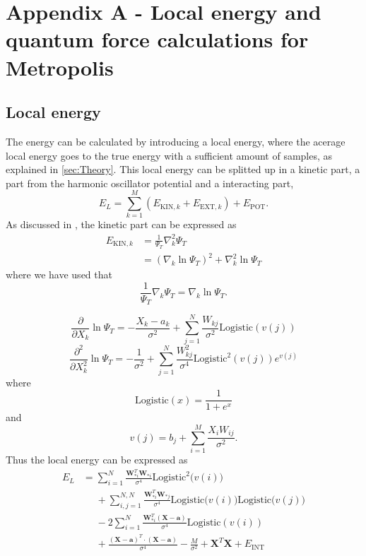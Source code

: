 \documentclass[norsk,a4paper,12pt]{article}
\begin{document}
\section{Appendix A - Local energy and quantum force calculations for Metropolis} \label{sec:appendix_A}

\subsection{Local energy}

The energy can be calculated by introducing a local energy, where the acerage local energy goes to the true energy with a sufficient amount of samples, as explained in \ref{sec:Theory}. This local energy can be splitted up in a kinetic part, a part from the harmonic oscillator potential and a interacting part,
\begin{equation}
E_L=\sum_{k=1}^{M}(E_{\text{KIN},k} + E_{\text{EXT},k})+E_{\text{POT}}.
\end{equation}
As discussed in \cite{Nordhagen}, the kinetic part can be expressed as
\begin{align}
E_{\text{KIN},k}&=\frac{1}{\Psi_T}\nabla_k^2\Psi_T\\
&=(\nabla_k\ln\Psi_T)^2+\nabla_k^2\ln\Psi_T
\end{align}
where we have used that
\begin{equation}
\frac{1}{\Psi_T}\nabla_k\Psi_T=\nabla_k\ln\Psi_T.
\end{equation}

\begin{equation}
\frac{\partial}{\partial X_k}\ln\Psi_T=-\frac{X_k-a_k}{\sigma^2}+\sum_{j=1}^{N}\frac{W_{kj}}{\sigma^2}\text{Logistic}(v(j))
\end{equation}
\begin{equation}
\frac{\partial^2}{\partial X_k^2}\ln\Psi_T=-\frac{1}{\sigma^2}+\sum_{j=1}^{N}\frac{W_{kj}^2}{\sigma^4}\text{Logistic}^2(v(j))e^{v(j)}
\end{equation}
where 
\begin{equation}
\text{Logistic}(x)=\frac{1}{1+e^x}
\end{equation}
and
\begin{equation}
v(j)=b_j+\sum_{i=1}^{M}\frac{X_iW_{ij}}{\sigma^2}.
\end{equation}
Thus the local energy can be expressed as
\begin{align}
E_L&=\sum_{i=1}^{N}\frac{\boldsymbol{W}_{*i}^T\boldsymbol{W}_{*i}}{\sigma^4}\text{Logistic}^2\big(v(i)\big)\\
&\phantom{=}+\sum_{i,j=1}^{N,N}\frac{\boldsymbol{W}_{*i}^T\boldsymbol{W}_{*j}}{\sigma^4}\text{Logistic}\big(v(i)\big)\text{Logistic}\big(v(j)\big)\\
&\phantom{=}-2\sum_{i=1}^N\frac{\boldsymbol{W}_{*i}^T(\boldsymbol{X}-\boldsymbol{a})}{\sigma^4}\text{Logistic}(v(i))\\
&\phantom{=}+\frac{(\boldsymbol{X}-\boldsymbol{a})^T\cdot(\boldsymbol{X}-\boldsymbol{a})}{\sigma^4}-\frac{M}{\sigma^2}+\boldsymbol{X}^T\boldsymbol{X}+E_{\text{INT}}
\end{align}
\end{document}
